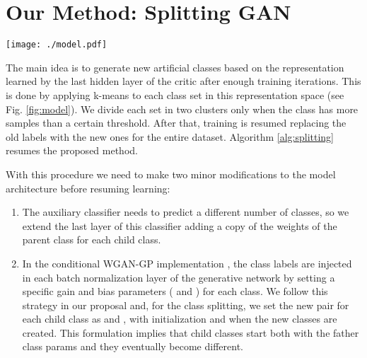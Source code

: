 \documentclass[times,twocolumn]{article}
\begin{document}
\section{Our Method: Splitting GAN}
\begin{figure*}[h]
 \centering
 \texttt{[image: ./model.pdf]}
\caption{Our Class Splitting GAN proposal is based on generating new classes by clustering in the representation space learned by the critic. This new classes are used in the standard supervised setup of WGAN.}
 \label{fig:model}
\end{figure*}

The main idea is to generate new artificial classes based on the representation learned by the last hidden layer of the critic after enough training iterations. This is done by applying k-means to each class set in this representation space (see Fig. \ref{fig:model}). We divide each set in two clusters only when the class has more samples than a certain threshold. After that, training is resumed replacing the old labels with the new ones for the entire dataset. Algorithm \ref{alg:splitting} resumes the proposed method.

With this procedure we need to make two minor modifications to the model architecture before resuming learning: 
\begin{enumerate}
\item The auxiliary classifier needs to predict a different number of classes, so we extend the last layer of this classifier adding a copy of the weights of the parent class for each child class.
\item In the conditional WGAN-GP implementation \cite{Gulrajani2017github}, the class labels are injected in each batch normalization layer of the generative network by setting a specific gain and bias parameters ( and ) for each class. We follow this strategy in our proposal and, for the class splitting, we set the new pair  for each child class as  and , with initialization  and  when the new classes are created. This formulation implies that child classes start both with the father class params and they eventually become different.  
\end{enumerate}
\end{document}
